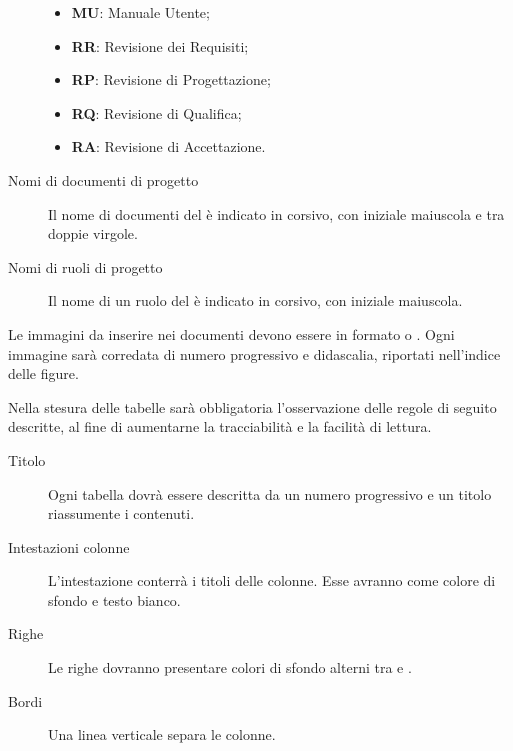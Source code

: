 \documentclass[a4paper, titlepage]{article}
\begin{document}
\begin{description}
\begin{itemize}
		\item \textbf{MU}: Manuale Utente;
		\item \textbf{RR}: Revisione dei Requisiti;
		\item \textbf{RP}: Revisione di Progettazione;
		\item \textbf{RQ}: Revisione di Qualifica;
		\item \textbf{RA}: Revisione di Accettazione.
	\end{itemize}
	\item[Nomi di documenti di progetto]
	Il nome di documenti del  è indicato in corsivo, con iniziale maiuscola e tra doppie virgole.
	\item[Nomi di ruoli di progetto]
	Il nome di un ruolo del  è indicato in corsivo, con iniziale maiuscola.
\end{description}


Le immagini da inserire nei documenti devono essere in formato  o . Ogni immagine sarà corredata di numero progressivo e didascalia, riportati nell'indice delle figure.

Nella stesura delle tabelle sarà obbligatoria l'osservazione delle regole di seguito descritte, al fine di aumentarne la tracciabilità e la facilità di lettura.
\begin{description}
	\item[Titolo] 
	Ogni tabella dovrà essere descritta da un numero progressivo e un titolo riassumente i contenuti.
	\item[Intestazioni colonne] 
	L'intestazione conterrà i titoli delle colonne. Esse avranno \crule[I] come colore di sfondo e testo bianco.
	\item[Righe] 
	Le righe dovranno presentare colori di sfondo alterni tra \crule[P] e \crule[D].
	\item[Bordi] 
	Una linea verticale \crule[I] separa le colonne.
\end{description}

\end{document}
